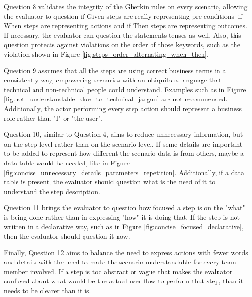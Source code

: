 Question 8 validates the integrity of the Gherkin rules on every scenario, allowing the evaluator to question if Given steps are really representing pre-conditions, if When steps are representing actions and if Then steps are representing outcomes. If necessary, the evaluator can question the statements tenses as well. Also, this question protects against violations on the order of those keywords, such as the violation shown in Figure \ref{fig:steps_order_alternating_when_then}. 

Question 9 assumes that all the steps are using correct business terms in a consistently way, empowering scenarios with an ubiquitous language that technical and non-technical people could understand. Examples such as in Figure \ref{fig:not_understandable_due_to_technical_jargon} are not recommended. Additionally, the actor performing every step action should represent a business role rather than "I" or "the user".

Question 10, similar to Question 4, aims to reduce unnecessary information, but on the step level rather than on the scenario level. If some details are important to be added to represent how different the scenario data is from others, maybe a data table would be needed, like in Figure \ref{fig:concise_unnecessary_details_parameters_repetition}. Additionally, if a data table is present, the evaluator should question what is the need of it to understand the step description.

Question 11 brings the evaluator to question how focused a step is on the "what" is being done rather than in expressing "how" it is doing that. If the step is not written in a declarative way, such as in Figure \ref{fig:concise_focused_declarative}, then the evaluator should question it now.

Finally, Question 12 aims to balance the need to express actions with fewer words and details with the need to make the scenario understandable for every team member involved. If a step is too abstract or vague that makes the evaluator confused about what would be the actual user flow to perform that step, than it needs to be clearer than it is. 